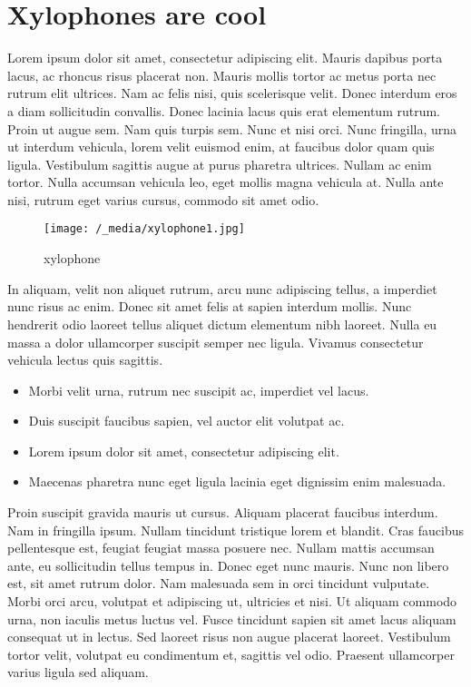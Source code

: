 \documentclass{article}
\begin{document}
\section{Xylophones are cool}\hypertarget{xylophones-are-cool}{}\label{xylophones-are-cool}

Lorem ipsum dolor sit amet, consectetur adipiscing elit. Mauris dapibus porta lacus, ac rhoncus risus placerat non. Mauris mollis tortor ac metus porta nec rutrum elit ultrices. Nam ac felis nisi, quis scelerisque velit. Donec interdum eros a diam sollicitudin convallis. Donec lacinia lacus quis erat elementum rutrum. Proin ut augue sem. Nam quis turpis sem. Nunc et nisi orci. Nunc fringilla, urna ut interdum vehicula, lorem velit euismod enim, at faucibus dolor quam quis ligula. Vestibulum sagittis augue at purus pharetra ultrices. Nullam ac enim tortor. Nulla accumsan vehicula leo, eget mollis magna vehicula at. Nulla ante nisi, rutrum eget varius cursus, commodo sit amet odio.

\begin{figure}
\begin{center}
\texttt{[image: /\_media/xylophone1.jpg]}
\end{center}
\caption{xylophone}

\end{figure}

In aliquam, velit non aliquet rutrum, arcu nunc adipiscing tellus, a imperdiet nunc risus ac enim. Donec sit amet felis at sapien interdum mollis. Nunc hendrerit odio laoreet tellus aliquet dictum elementum nibh laoreet. Nulla eu massa a dolor ullamcorper suscipit semper nec ligula. Vivamus consectetur vehicula lectus quis sagittis.

\begin{itemize}
\item Morbi velit urna, rutrum nec suscipit ac, imperdiet vel lacus.
\item Duis suscipit faucibus sapien, vel auctor elit volutpat ac.
\item Lorem ipsum dolor sit amet, consectetur adipiscing elit.
\item Maecenas pharetra nunc eget ligula lacinia eget dignissim enim malesuada.
\end{itemize}

Proin suscipit gravida mauris ut cursus. Aliquam placerat faucibus interdum. Nam in fringilla ipsum. Nullam tincidunt tristique lorem et blandit. Cras faucibus pellentesque est, feugiat feugiat massa posuere nec. Nullam mattis accumsan ante, eu sollicitudin tellus tempus in. Donec eget nunc mauris. Nunc non libero est, sit amet rutrum dolor. Nam malesuada sem in orci tincidunt vulputate. Morbi orci arcu, volutpat et adipiscing ut, ultricies et nisi. Ut aliquam commodo urna, non iaculis metus luctus vel. Fusce tincidunt sapien sit amet lacus aliquam consequat ut in lectus. Sed laoreet risus non augue placerat laoreet. Vestibulum tortor velit, volutpat eu condimentum et, sagittis vel odio. Praesent ullamcorper varius ligula sed aliquam.
\end{document}
